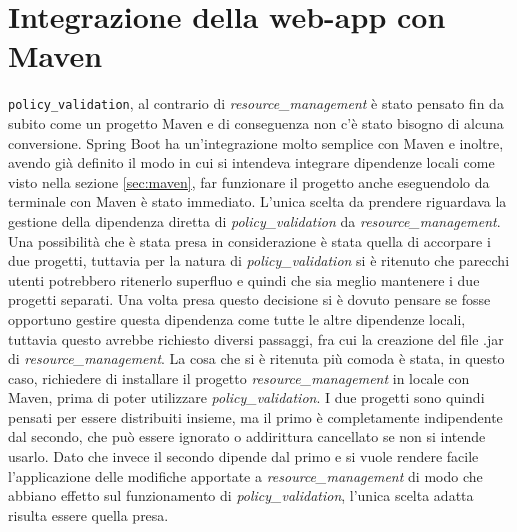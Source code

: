 \section{Integrazione della web-app con Maven}
\texttt{policy\_validation}, al contrario di \emph{resource\_management} è stato pensato fin da subito come un progetto Maven e di conseguenza non c'è stato bisogno di alcuna conversione. Spring Boot ha un'integrazione molto semplice con Maven e inoltre, avendo già definito il modo in cui si intendeva integrare dipendenze locali come visto nella sezione \ref{sec:maven}, far funzionare il progetto anche eseguendolo da terminale con Maven è stato immediato.\medbreak
L'unica scelta da prendere riguardava la gestione della dipendenza diretta di \emph{policy\_validation} da \emph{resource\_management}. Una possibilità che è stata presa in considerazione è stata quella di accorpare i due progetti, tuttavia per la natura di \emph{policy\_validation} si è ritenuto che parecchi utenti potrebbero ritenerlo superfluo e quindi che sia meglio mantenere i due progetti separati.\medbreak
Una volta presa questo decisione si è dovuto pensare se fosse opportuno gestire questa dipendenza come tutte le altre dipendenze locali, tuttavia questo avrebbe richiesto diversi passaggi, fra cui la creazione del file .jar di \emph{resource\_management}. La cosa che si è ritenuta più comoda è stata, in questo caso, richiedere di installare il progetto \emph{resource\_management} in locale con Maven, prima di poter utilizzare \emph{policy\_validation}.\medbreak
I due progetti sono quindi pensati per essere distribuiti insieme, ma il primo è completamente indipendente dal secondo, che può essere ignorato o addirittura cancellato se non si intende usarlo. Dato che invece il secondo dipende dal primo e si vuole rendere facile l'applicazione delle modifiche apportate a \emph{resource\_management} di modo che abbiano effetto sul funzionamento di \emph{policy\_validation}, l'unica scelta adatta risulta essere quella presa.

